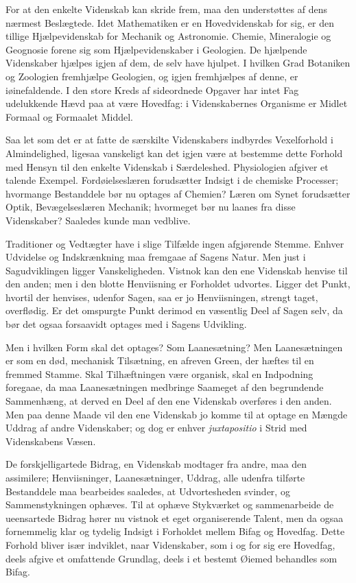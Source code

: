 \documentclass[12pt]{book}
\newcommand{\opage}[1]{\marginnote{\footnotesize\textit{[#1]}}}
\begin{document}
For at den enkelte Videnskab kan skride frem, maa den understøttes af dens nærmest
Beslægtede. Idet Mathematiken er en Hovedvidenskab for sig, er den tillige Hjælpevidenskab
for Mechanik og Astronomie. Chemie, Mineralogie og Geognosie forene sig som
Hjælpevidenskaber i Geologien. De hjælpende Videnskaber hjælpes igjen af dem, de selv have
hjulpet. I hvilken Grad Botaniken og Zoologien fremhjælpe Geologien, og igjen fremhjælpes af
denne, er iøinefaldende. I den store Kreds af sideordnede Opgaver har intet Fag udelukkende
Hævd paa at være Hovedfag: i Videnskabernes Organisme er Midlet Formaal og Formaalet Middel.

\opage{96} Saa let som det er at fatte de særskilte Videnskabers indbyrdes Vexelforhold i
Almindelighed, ligesaa vanskeligt kan det igjen være at bestemme dette Forhold med Hensyn
til den enkelte Videnskab i Særdeleshed. Physiologien afgiver et talende Exempel.
Fordøielseslæren forudsætter Indsigt i de chemiske Processer; hvormange Bestanddele bør nu
optages af Chemien? Læren om Synet forudsætter Optik, Bevægelseslæren Mechanik; hvormeget
bør nu laanes fra disse Videnskaber? Saaledes kunde man vedblive.

Traditioner og Vedtægter have i slige Tilfælde ingen afgjørende Stemme. Enhver Udvidelse og
Indskrænkning maa fremgaae af Sagens Natur. Men just i Sagudviklingen ligger
Vanskeligheden. Vistnok kan den ene Videnskab henvise til den anden; men i den blotte
Henviisning er Forholdet udvortes. Ligger det Punkt, hvortil der henvises, udenfor Sagen,
saa er jo Henviisningen, strengt taget, overflødig. Er det omspurgte Punkt derimod en
væsentlig Deel af Sagen selv, da bør det ogsaa forsaavidt optages med i Sagens Udvikling.

Men i hvilken Form skal det optages? Som Laanesætning? Men Laanesætningen er som en død,
mechanisk Tilsætning, en afreven Green, der hæftes til en fremmed Stamme. Skal
Tilhæftningen være organisk, skal en Indpodning foregaae, da maa Laanesætningen medbringe
Saameget af den begrundende Sammenhæng, at derved en Deel af den ene Videnskab overføres i
den anden. Men paa denne Maade vil den ene Videnskab jo komme til at optage en Mængde
Uddrag af andre Videnskaber; og dog er enhver \textit{juxtapositio} i Strid med
Videnskabens Væsen.

De forskjelligartede Bidrag, en Videnskab modtager fra andre, maa den assimilere;
Henviisninger, Laanesætninger, Uddrag, alle udenfra tilførte Bestanddele maa bearbeides
saaledes, at Udvortesheden svinder, og Sammenstykningen ophæves.
\opage{97} Til at ophæve Stykværket og sammenarbeide de ueensartede Bidrag hører nu vistnok et eget
organiserende Talent, men da ogsaa fornemmelig klar og tydelig Indsigt i Forholdet mellem
Bifag og Hovedfag. Dette Forhold bliver især indviklet, naar Videnskaber, som i og for sig
ere Hovedfag, deels afgive et omfattende Grundlag, deels i et bestemt Øiemed behandles som
Bifag.
\end{document}

